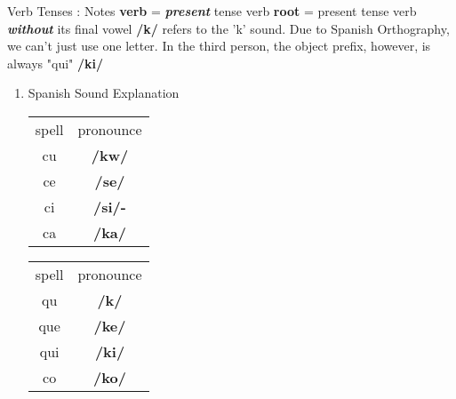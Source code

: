 \documentclass[12pt]{beamer}
\begin{document}
\begin{frame}
\begin{columns}[t]
    \begin{column}{.23\linewidth} %
    	\begin{block}{Verb Tenses : Notes}
    		\textbf{verb} = \textbf{\textit{present}} tense verb \newline
    		\textbf{root} = present tense verb \textbf{\textit{without}} its final vowel \newline
    		\newline
    		\textbf{/k/} refers to the 'k' sound. Due to Spanish Orthography, we can't just use one letter. \newline
    		In the third person, the object prefix, however, is always "qui" \textbf{/ki/} \newline
    		\begin{enumerate}
    			\item Spanish Sound Explanation \newline
    			\begin{tabular}[t]{c|c|}
    				spell & pronounce \\
    				\cline{1-2}
    				cu & \textbf{/kw/} 	\\
    				ce & \textbf{/se/} 	\\
    				ci & \textbf{/si/-} \\
    				ca & \textbf{/ka/} 	\\
    			\end{tabular}%
    			\begin{tabular}[t]{c|c}
    				spell & pronounce \\
    				\cline{1-2}
    				qu & \textbf{/k/} \\
    				que & \textbf{/ke/} \\
    				qui & \textbf{/ki/}  \\
    				co & \textbf{/ko/} 	\\
    			\end{tabular}%
    			\newline
    			

\end{enumerate}
\end{block}
\end{column}
\end{columns}
\end{frame}
\end{document}
